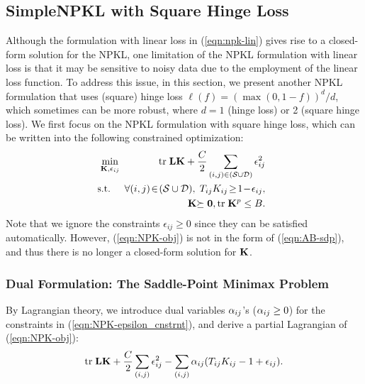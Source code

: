 \subsection{SimpleNPKL with Square Hinge Loss} \label{sec:npk-sqr-hinge}

Although the formulation with linear loss in (\ref{eqn:npk-lin}) gives rise to a
closed-form solution for the NPKL, one limitation of the NPKL formulation with linear
loss is that it may be sensitive to noisy data due to the employment of the linear loss
function. To address this issue, in this section, we present another NPKL formulation
that uses (square) hinge loss $\ell(f) = (\max(0,1-f))^d/d$, which sometimes can be more
robust, where $d=1$ (hinge loss) or 2 (square hinge loss).
We first focus on the NPKL
formulation with square hinge loss, which can be written into the following constrained
optimization:
\begin{eqnarray}
\!& \!\min_{\K, \epsilon_{ij}}\!&\!\tr \L\K + \frac{C}{2}\sum_{(i,j)\in(\SS\cup\DD)}\epsilon_{ij}^2  \label{eqn:NPK-obj}\\
\!\!&\!\!\mbox{s.t.}\!\!&\!\!\forall (i,j)\!\in \!(\SS\cup\DD),
                                 \; T_{ij}K_{ij}\! \geq\! 1 \!- \!\epsilon_{ij},
                                 \label{eqn:NPK-epsilon_cnstrnt} \\
\!&\!\!  &\K\psd, \tr \K^p \leq B.
\nonumber
\end{eqnarray}
Note that we ignore the constraints $\epsilon_{ij}\geq 0$ since they can be satisfied
automatically. However, (\ref{eqn:NPK-obj}) is not in the form of
(\ref{eqn:AB-sdp}), and thus there is no longer a closed-form solution for ${\bf K}$.

\subsubsection{Dual Formulation: The Saddle-Point Minimax Problem}

By Lagrangian theory, we introduce dual variables ${\alpha}_{ij}$'s (${\alpha}_{ij}\geq 0$) for the constraints in
(\ref{eqn:NPK-epsilon_cnstrnt}), and derive a partial Lagrangian of
(\ref{eqn:NPK-obj}):
\begin{equation}
\tr \L\K + \frac{C}{2}\sum_{(i,j)} \epsilon_{ij}^2- \sum_{(i,j)}
\a_{ij}( T_{ij}K_{ij} - 1 + \epsilon_{ij}).\label{eqn:NPK-lgrngn}
\end{equation}


